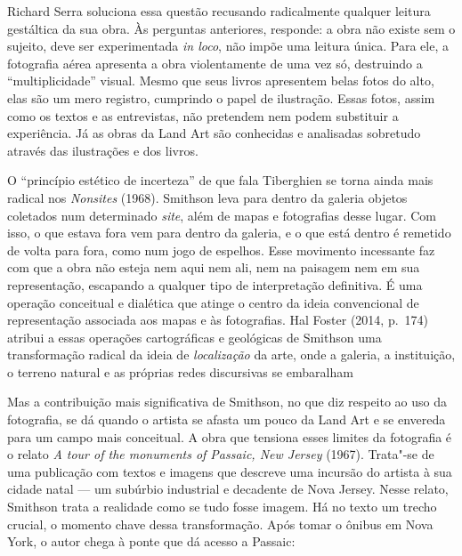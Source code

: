 Richard Serra soluciona essa questão recusando radicalmente qualquer
leitura gestáltica da sua obra. Às perguntas anteriores, responde: a
obra não existe sem o sujeito, deve ser experimentada \emph{in loco},
não impõe uma leitura única. Para ele, a fotografia aérea apresenta a
obra violentamente de uma vez só, destruindo a ``multiplicidade''
visual. Mesmo que seus livros apresentem belas fotos do alto, elas são um mero registro, cumprindo o papel de
ilustração. Essas fotos, assim como os textos e as entrevistas, não
pretendem nem podem substituir a experiência. Já as obras da Land Art
são conhecidas e analisadas sobretudo através das ilustrações e dos
livros.

O ``princípio estético de incerteza'' de que fala Tiberghien se torna
ainda mais radical nos \emph{Nonsites} (1968). Smithson leva para dentro
da galeria objetos coletados num determinado \emph{site}, além de mapas
e fotografias desse lugar. Com isso, o que estava fora vem para dentro
da galeria, e o que está dentro é remetido de volta para fora, como num
jogo de espelhos. Esse movimento incessante faz com que a obra não
esteja nem aqui nem ali, nem na paisagem nem em sua representação,
escapando a qualquer tipo de interpretação definitiva. É uma operação
conceitual e dialética que atinge o centro da ideia convencional de
representação associada aos mapas e às fotografias. Hal Foster (2014, p.~174) atribui a essas operações cartográficas e geológicas de Smithson
uma transformação radical da ideia de \emph{localização} da arte, onde a
galeria, a instituição, o terreno natural e as próprias redes discursivas
se embaralham

Mas a contribuição mais significativa de Smithson, no que diz respeito
ao uso da fotografia, se dá quando o artista se afasta um pouco da Land
Art e se envereda para um campo mais conceitual. A obra que
tensiona esses limites da fotografia é o relato \emph{A tour
of the monuments of Passaic, New Jersey} (1967). Trata"-se de uma
publicação com textos e imagens que descreve uma incursão do artista à
sua cidade natal --- um subúrbio industrial e decadente de Nova Jersey.
Nesse relato, Smithson trata a realidade como se tudo fosse imagem. Há
no texto um trecho crucial, o momento chave dessa transformação. Após
tomar o ônibus em Nova York, o autor chega à ponte que dá acesso a
Passaic:

